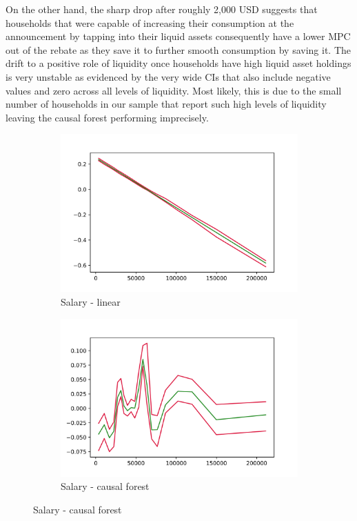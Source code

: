 On the other hand, the sharp drop after roughly 2,000 USD suggests that households that were capable of increasing their consumption at the announcement by tapping into their liquid assets consequently have a lower MPC out of the rebate as they save it to further smooth consumption by saving it. The drift to a positive role of liquidity once households have high liquid asset holdings is very unstable as evidenced by the very wide CIs that also include negative values and zero across all levels of liquidity. Most likely, this is due to the small number of households in our sample that report such high levels of liquidity leaving the causal forest performing imprecisely. \\
\begin{figure}[t]
    \centering
    \begin{subfigure}{0.5\textwidth}
        \includegraphics[width=\linewidth]{figures/ALE/chNDexp/spec3_linear_FSALARYM.png}
        \caption{Salary - linear}
    \end{subfigure}\hfill
    \begin{subfigure}{0.5\textwidth}
        \includegraphics[width=\linewidth]{figures/ALE/chNDexp/spec3_cf_FSALARYM.png}
        \caption{Salary - causal forest}
    \end{subfigure}\hfill


\end{figure}
